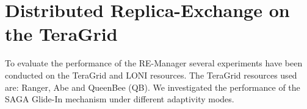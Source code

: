 \documentclass{rspublic}
\newcommand{\replicaagent}[1]{Replica-Agent }
\begin{document}
% 
% 
% 
% 





\section{Distributed Replica-Exchange on the TeraGrid}
\label{sec:exp}
        
To evaluate the performance of the RE-Manager several experiments have
been conducted on the TeraGrid and LONI resources. The TeraGrid
resources used are: Ranger, Abe and QueenBee (QB).  We investigated
the performance of the SAGA Glide-In mechanism under different
adaptivity modes.
\end{document}
